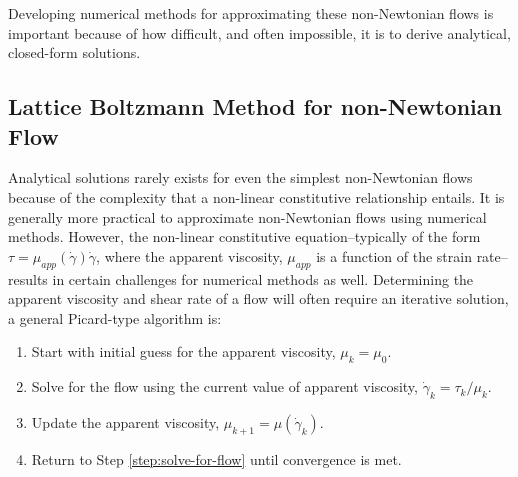 \documentclass{article}
\begin{document}
Developing numerical methods for approximating these non-Newtonian flows is important because of how difficult, and often impossible, it is to derive analytical, closed-form solutions.

\subsection{Lattice Boltzmann Method for non-Newtonian Flow} %

Analytical solutions rarely exists for even the simplest non-Newtonian flows because of the complexity that a non-linear constitutive relationship entails.
It is generally more practical to approximate non-Newtonian flows using numerical methods.
However, the non-linear constitutive equation--typically of the form $\tau = \mu_{app}(\dot{\gamma}) \dot{\gamma}$, where the apparent viscosity, $\mu_{app}$ is a function of the strain rate--results in certain challenges for numerical methods as well.
Determining the apparent viscosity and shear rate of a flow will often require an iterative solution, a general Picard-type algorithm is:

\begin{enumerate}
	\item Start with initial guess for the apparent viscosity, $\mu_k = \mu_0$.
	\item \label{step:solve-for-flow} Solve for the flow using the current value of apparent viscosity, $\dot{\gamma}_k = \tau_k / \mu_k$.
	\item Update the apparent viscosity, $\mu_{k+1} = \mu(\dot{\gamma}_k)$.
	\item Return to Step \ref{step:solve-for-flow} until convergence is met.
\end{enumerate}
\end{document}
